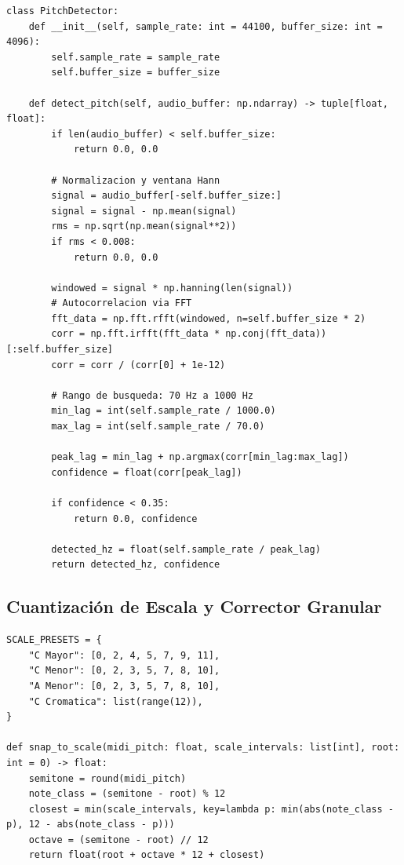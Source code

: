 \documentclass[11pt,a4paper]{article}
\begin{document}
\begin{lstlisting}
class PitchDetector:
    def __init__(self, sample_rate: int = 44100, buffer_size: int = 4096):
        self.sample_rate = sample_rate
        self.buffer_size = buffer_size

    def detect_pitch(self, audio_buffer: np.ndarray) -> tuple[float, float]:
        if len(audio_buffer) < self.buffer_size:
            return 0.0, 0.0

        # Normalizacion y ventana Hann
        signal = audio_buffer[-self.buffer_size:]
        signal = signal - np.mean(signal)
        rms = np.sqrt(np.mean(signal**2))
        if rms < 0.008:
            return 0.0, 0.0

        windowed = signal * np.hanning(len(signal))
        # Autocorrelacion via FFT
        fft_data = np.fft.rfft(windowed, n=self.buffer_size * 2)
        corr = np.fft.irfft(fft_data * np.conj(fft_data))[:self.buffer_size]
        corr = corr / (corr[0] + 1e-12)

        # Rango de busqueda: 70 Hz a 1000 Hz
        min_lag = int(self.sample_rate / 1000.0)
        max_lag = int(self.sample_rate / 70.0)

        peak_lag = min_lag + np.argmax(corr[min_lag:max_lag])
        confidence = float(corr[peak_lag])

        if confidence < 0.35:
            return 0.0, confidence

        detected_hz = float(self.sample_rate / peak_lag)
        return detected_hz, confidence
\end{lstlisting}

\subsection{Cuantización de Escala y Corrector Granular}
\begin{lstlisting}
SCALE_PRESETS = {
    "C Mayor": [0, 2, 4, 5, 7, 9, 11],
    "C Menor": [0, 2, 3, 5, 7, 8, 10],
    "A Menor": [0, 2, 3, 5, 7, 8, 10],
    "C Cromatica": list(range(12)),
}

def snap_to_scale(midi_pitch: float, scale_intervals: list[int], root: int = 0) -> float:
    semitone = round(midi_pitch)
    note_class = (semitone - root) % 12
    closest = min(scale_intervals, key=lambda p: min(abs(note_class - p), 12 - abs(note_class - p)))
    octave = (semitone - root) // 12
    return float(root + octave * 12 + closest)
\end{lstlisting}
\end{document}
